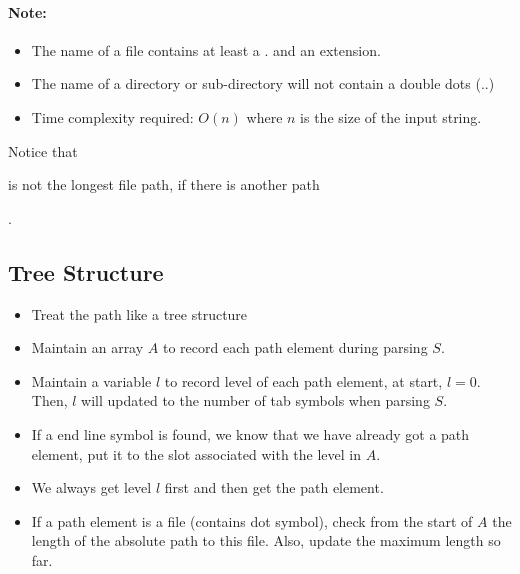 \paragraph{Note:}

\begin{itemize}
\item The name of a file contains at least a . and an extension.
\item The name of a directory or sub-directory will not contain a double dots (..)
\item Time complexity required: $O(n)$ where $n$ is the size of the input string.
\end{itemize}

Notice that 
\par
{} 
\par
is not the longest file path, if there is another path
\par
{}.

\subsection{Tree Structure}
\begin{itemize}
\item Treat the path like a tree structure
\item Maintain an array $A$ to record each path element during parsing $S$.
\item Maintain a variable $l$ to record level of each path element, at start, $l=0$. Then, $l$ will updated to the number of tab symbols when parsing $S$. 
\item If a end line symbol is found, we know that we have already got a path element, put it to the slot associated with the level in $A$.
\item We always get level $l$ first and then get the path element.
\item If a path element is a file (contains dot symbol), check from the start of $A$ the length of the absolute path to this file. Also, update the maximum length so far.
\end{itemize}

